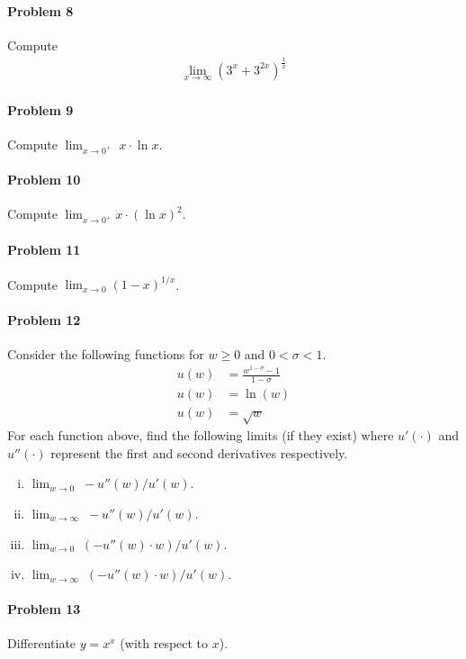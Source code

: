 \documentclass[a4paper, 11pt]{article}
\begin{document}
\paragraph{Problem 8}
Compute
\begin{align}
    \lim_{x\rightarrow \infty} \left( 3^x + 3^{2x} \right)^{\frac{1}{x}}  \nonumber
\end{align}


\paragraph{Problem 9}
Compute $\lim_{x\rightarrow 0^+} \; x \cdot \ln x$.


\paragraph{Problem 10}
Compute $\lim_{x \rightarrow 0^+} x \cdot \left( \ln x \right)^2$.


\paragraph{Problem 11}
Compute $\lim_{x \rightarrow 0 } (1-x)^{1/x}$.


\paragraph{Problem 12}
Consider the following functions for $w \geq 0$ and $0 < \sigma < 1$.
\begin{align}
    u(w) &= \frac{w^{1-\sigma}-1}{1-\sigma}  \nonumber \\
    u(w) &= \ln(w) \nonumber \nonumber \\
    u(w) &= \sqrt{w} \nonumber 
\end{align}
For each function above, find the following limits (if they exist) where $u'(\cdot)$ and $u''(\cdot)$ represent the first and second derivatives respectively.
\begin{enumerate}[(i)]
	\item $\lim_{w\rightarrow 0} \; -u''(w)/u'(w)$.
	\item $\lim_{w\rightarrow \infty} \; -u''(w)/u'(w)$.
	\item $\lim_{w\rightarrow 0} \; (-u''(w)\cdot w)/u'(w)$.
	\item $\lim_{w\rightarrow \infty} \; (-u''(w)\cdot w)/u'(w)$.
\end{enumerate}

\paragraph{Problem 13} Differentiate $y = x^x$ (with respect to $x$).
\end{document}
